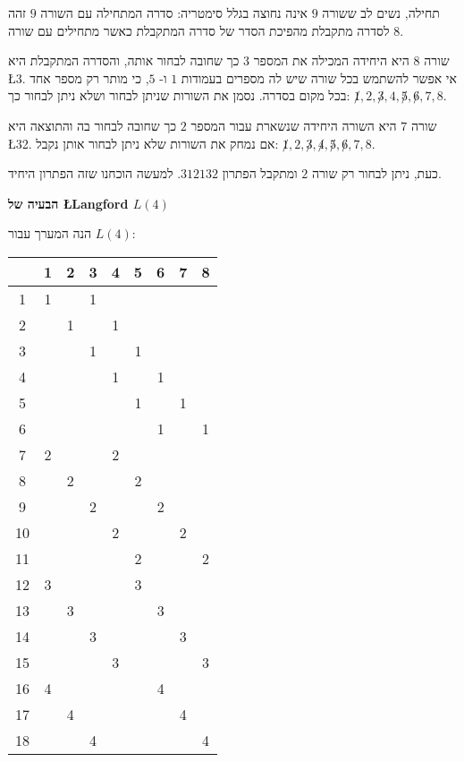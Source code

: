 \documentclass[12pt,a4paper]{article}
\begin{document}
תחילה, נשים לב ששורה
$9$
אינה נחוצה בגלל סימטריה: סדרה המתחילה עם השורה
$9$
זהה לסדרה מתקבלת מהפיכת הסדר של סדרה המתקבלת כאשר מתחילים עם שורה
$8$.

שורה 
$8$
היא היחידה המכילה את המספר
$3$
כך שחובה לבחור אותה, והסדרה המתקבלת היא
\L{3\textvisiblespace \textvisiblespace {}\textvisiblespace}. 
אי אפשר להשתמש בכל שורה שיש לה מספרים בעמודות
$1$
ו-
$5$,
כי מותר רק מספר אחד בכל מקום בסדרה. נסמן את השורות שניתן לבחור ושלא ניתן לבחור כך:
$\not 1,2,\not 3,4,\not 5, \not 6, 7, 8$.

שורה
$7$
היא השורה היחידה שנשארת עבור המספר
$2$
כך שחובה לבחור בה והתוצאה היא
\L{32}.
אם נמחק את השורות שלא ניתן לבחור אותן נקבל:
$\not 1,2,\not 3,\not 4,\not 5, \not 6, 7, 8$.

כעת, ניתן לבחור רק שורה
$2$
ומתקבל הפתרון
$3{}1{}2{}1{}3{}2$.
למעשה הוכחנו שזה הפתרון היחיד.

\bigskip

\begin{center}
\textbf{\Large 
הבעיה של
\L{Langford}
$L(4)$
}
\end{center}

הנה המערך עבור
$L(4)$:
\begin{center}
\begin{tabular}{|c||c|c|c|c|c|c|c|c|}
\hline
&1&2&3&4&5&6&7&8\\\hline\hline
1&1&&1&&&&&\\\hline
2&&1&&1&&&&\\\hline
3&&&1&&1&&&\\\hline
4&&&&1&&1&&\\\hline
5&&&&&1&&1&\\\hline
6&&&&&&1&&1\\\hline
7&2&&&2&&&&\\\hline
8&&2&&&2&&&\\\hline
9&&&2&&&2&&\\\hline
10&&&&2&&&2&\\\hline
11&&&&&2&&&2\\\hline
12&3&&&&3&&&\\\hline
13&&3&&&&3&&\\\hline
14&&&3&&&&3&\\\hline
15&&&&3&&&&3\\\hline
16&4&&&&&4&&\\\hline
17&&4&&&&&4&\\\hline
18&&&4&&&&&4\\\hline
\end{tabular}
\end{center}
\end{document}
